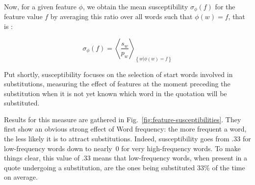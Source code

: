 Now, for a given feature $\phi$, we obtain the mean susceptibility $\sigma_{\phi}(f)$ for the feature value $f$ by averaging this ratio over all words such that $\phi(w) = f$, that is%
:

$$\sigma_{\phi}(f) = \left< \frac{s_w}{p_w} \right>_{\left\lbrace w | \phi(w) = f \right\rbrace}$$

Put shortly, susceptibility focuses on the selection of start words involved in substitutions, measuring the effect of features at the moment preceding the substitution when it is not yet known which word in the quotation will be substituted.

\medskip






Results for this measure are gathered in Fig.~\ref{fig:feature-susceptibilities}. They first show an obvious strong effect of Word frequency: the more frequent a word, the less likely it is to attract substitutions.
Indeed, susceptibility goes from $.33$ for low-frequency words down to nearly~0 for very high-frequency words.
To make things clear, this value of $.33$ means that low-frequency words, when present in a quote undergoing a substitution, are the ones being substituted 33\% of the time on average.

